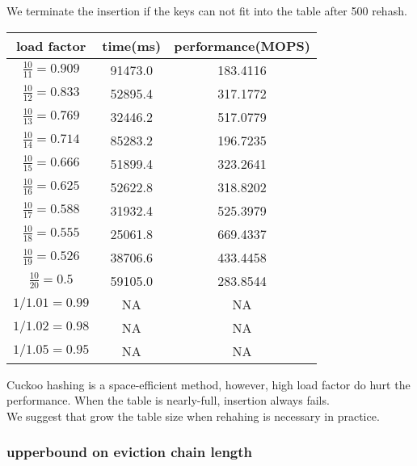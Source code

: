 \documentclass{article}
\begin{document}
We terminate the insertion if the keys can not fit into the table after 500 rehash.

\begin{tabular}{|c|c|c|}
	\hline
	load factor           & time(ms) & performance(MOPS) \\
	\hline
	$\frac{10}{11}=0.909$ & 91473.0  & 183.4116          \\
	$\frac{10}{12}=0.833$ & 52895.4  & 317.1772          \\
	$\frac{10}{13}=0.769$ & 32446.2  & 517.0779          \\
	$\frac{10}{14}=0.714$ & 85283.2  & 196.7235          \\
	$\frac{10}{15}=0.666$ & 51899.4  & 323.2641          \\
	$\frac{10}{16}=0.625$ & 52622.8  & 318.8202          \\
	$\frac{10}{17}=0.588$ & 31932.4  & 525.3979          \\
	$\frac{10}{18}=0.555$ & 25061.8  & 669.4337          \\
	$\frac{10}{19}=0.526$ & 38706.6  & 433.4458          \\
	$\frac{10}{20}=0.5  $ & 59105.0  & 283.8544          \\
	\hline
	$1/1.01=0.99$         & NA       & NA                \\
	$1/1.02=0.98$         & NA       & NA                \\
	$1/1.05=0.95$         & NA       & NA                \\
	\hline
\end{tabular}

Cuckoo hashing is a space-efficient method, however, high load factor do hurt the performance.
When the table is nearly-full, insertion always fails.\\
We suggest that grow the table size when rehahing is necessary in practice.

\subsubsection*{upperbound on eviction chain length}
\end{document}
